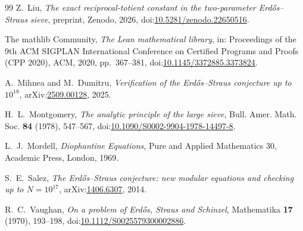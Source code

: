 \documentclass{amsart}
\theoremstyle{definition}
\theoremstyle{remark}
\numberwithin{equation}{section}
\begin{document}
\begin{thebibliography}{99}
Z.~Liu, \emph{The exact reciprocal-totient constant in the two-parameter Erd\H{o}s--Straus sieve}, preprint, Zenodo, 2026, doi:\href{https://doi.org/10.5281/zenodo.22650516}{10.5281/zenodo.22650516}.

The mathlib Community, \emph{The Lean mathematical library}, in: Proceedings of the 9th ACM SIGPLAN International Conference on Certified Programs and Proofs (CPP 2020), ACM, 2020, pp.~367--381, doi:\href{https://doi.org/10.1145/3372885.3373824}{10.1145/3372885.3373824}.

A.~Mihnea and M.~Dumitru, \emph{Verification of the Erd\H{o}s--Straus conjecture up to $10^{18}$}, arXiv:\href{https://arxiv.org/abs/2509.00128}{2509.00128}, 2025.

H.~L.~Montgomery, \emph{The analytic principle of the large sieve}, Bull. Amer. Math. Soc. \textbf{84} (1978), 547--567, doi:\href{https://doi.org/10.1090/S0002-9904-1978-14497-8}{10.1090/S0002-9904-1978-14497-8}.

L.~J.~Mordell, \emph{Diophantine Equations}, Pure and Applied Mathematics 30, Academic Press, London, 1969.

S.~E.~Salez, \emph{The Erd\H{o}s--Straus conjecture: new modular equations and checking up to $N=10^{17}$}, arXiv:\href{https://arxiv.org/abs/1406.6307}{1406.6307}, 2014.

R.~C.~Vaughan, \emph{On a problem of Erd\H{o}s, Straus and Schinzel}, Mathematika \textbf{17} (1970), 193--198, doi:\href{https://doi.org/10.1112/S0025579300002886}{10.1112/S0025579300002886}.

\end{thebibliography}
\end{document}
